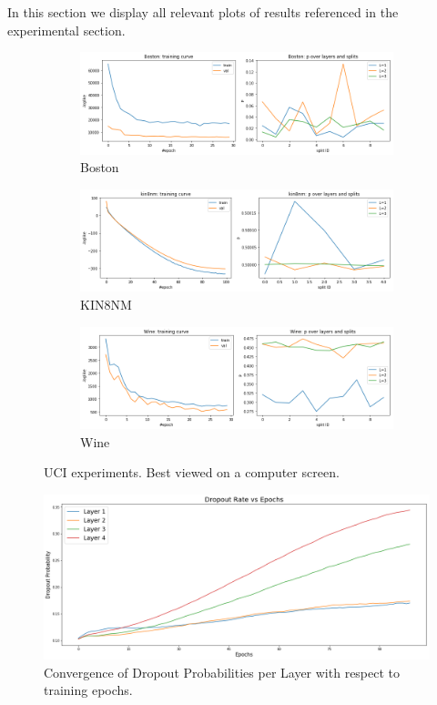 \documentclass{article}
\begin{document}
In this section we display all relevant plots of results referenced in the experimental section.
\begin{figure}[!h]
\centering
\begin{subfigure}{.33\textwidth}
  \centering
  \includegraphics[width=\linewidth]{boston.png}
  \caption{Boston}
\end{subfigure}%
\begin{subfigure}{.33\textwidth}
  \centering
  \includegraphics[width=\linewidth]{kin8nm.png}
  \caption{KIN8NM}
\end{subfigure}%
\begin{subfigure}{.33\textwidth}
  \centering
  \includegraphics[width=\linewidth]{wine.png}
  \caption{Wine}
\end{subfigure}
\caption{UCI experiments. Best viewed on a computer screen.}
\label{fig:uci}
\end{figure}


\begin{figure}[!h]
\centering
\centering
\includegraphics[width=0.5\linewidth]{dropout_convergence_100.png}
\caption{Convergence of Dropout Probabilities per Layer with respect to training epochs.}
\label{fig:mnist_convergence}
\end{figure}
\end{document}
